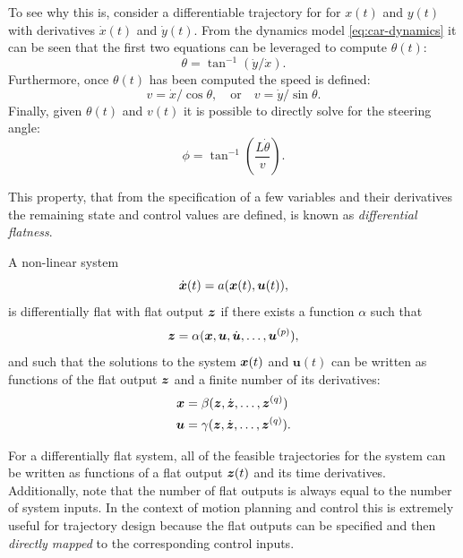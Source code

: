 \begin{example}
To see why this is, consider a differentiable trajectory for for $x(t)$ and $y(t)$ with derivatives $\dot{x}(t)$ and $\dot{y}(t)$. From the dynamics model \eqref{eq:car-dynamics} it can be seen that the first two equations can be leveraged to compute $\theta(t)$:
\begin{equation*}
\theta = \tan^{-1}(\dot{y}/\dot{x}).
\end{equation*}
Furthermore, once $\theta(t)$ has been computed the speed is defined:
\begin{equation*}
v = \dot{x}/\cos\theta, \quad \text{or}  \quad v = \dot{y}/\sin\theta.
\end{equation*}
Finally, given $\theta(t)$ and $v(t)$ it is possible to directly solve for the steering angle:
\begin{equation*}
\phi = \tan ^{-1}(\frac{L\dot{\theta}}{v}).
\end{equation*}

This property, that from the specification of a few variables and their derivatives the remaining state and control values are defined, is known as \textit{differential flatness}. 
\end{example}

\begin{definition}
A non-linear system
\begin{equation} \label{eq:diffflatsys}
\dot{\bm{x}}(t) = a(\bm{x}(t),\bm{u}(t)),
\end{equation}
is differentially flat with flat output $\bm{z}$ if there exists a function $\alpha$ such that
\begin{equation}
\bm{z} = \alpha (\bm{x},\bm{u},\dot{\bm{u}},\dots,\bm{u}^{(p)}),
\end{equation}
and such that the solutions to the system $\bm{x}(t)$ and $\bm{u}(t)$ can be written as functions of the flat output $\bm{z}$ and a finite number of its derivatives:
\begin{equation} \label{eq:ztoxu}
\begin{split}
\bm{x} &= \beta (\bm{z},\dot{\bm{z}},\dots,\bm{z}^{(q)}) \\
\bm{u} &= \gamma (\bm{z},\dot{\bm{z}},\dots,\bm{z}^{(q)}).
\end{split}
\end{equation}
\end{definition}

For a differentially flat system, all of the feasible trajectories for the system can be written as functions of a flat output $\bm{z}(t)$ and its time derivatives. Additionally, note that the number of flat outputs is always equal to the number of system inputs. In the context of motion planning and control this is extremely useful for trajectory design because the flat outputs can be specified and then \textit{directly mapped} to the corresponding control inputs.

